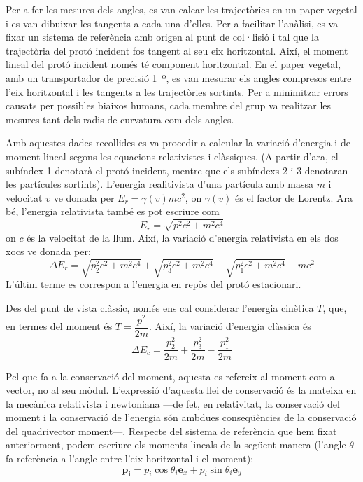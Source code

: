\documentclass[12pt]{article}
\begin{document}
Per a fer les mesures dels angles, es van calcar les trajectòries en un paper vegetal i es van dibuixar les tangents a cada una d'elles. Per a facilitar l'anàlisi, es va fixar un sistema de referència amb origen al punt de col·lisió i tal que la trajectòria del protó incident fos tangent al seu eix horitzontal. Així, el moment lineal del protó incident només té component horitzontal. En el paper vegetal, amb un transportador de precisió \SI{1}{º}, es van mesurar els angles compresos entre l'eix horitzontal i les tangents a les trajectòries sortints. Per a minimitzar errors causats per possibles biaixos humans, cada membre del grup va realitzar les mesures tant dels radis de curvatura com dels angles.

Amb aquestes dades recollides es va procedir a calcular la variació d'energia i de moment lineal segons les equacions relativistes i clàssiques. (A partir d'ara, el subíndex 1 denotarà el protó incident, mentre que els subíndexs 2 i 3 denotaran les partícules sortints). L'energia realitivista d'una partícula amb massa \( m \) i velocitat \( v \) ve donada per \( E_{r} = \gamma(v)mc^{2} \), on \( \gamma(v) \) és el factor de Lorentz. Ara bé, l'energia relativista també es pot escriure com 
\begin{equation}
  E_{r} = \sqrt{p^{2}c^{2} + m^{2}c^{4}}
\end{equation}
on \( c \) és la velocitat de la llum. Així, la variació d'energia relativista en els dos xocs ve donada per:
\begin{equation}
  \Delta E_{r} = \sqrt{p_{2}^{2}c^{2} + m^{2}c^{4}} + \sqrt{p_{3}^{2}c^{2} + m^{2}c^{4}} - \sqrt{p_{1}^{2}c^{2} + m^{2}c^{4}} - mc^{2}
\end{equation}
L'últim terme es correspon a l'energia en repòs del protó estacionari.

Des del punt de vista clàssic, només ens cal considerar l'energia cinètica \( T \), que, en termes del moment és \( T = \dfrac{p^{2}}{2m} \). Així, la variació d'energia clàssica és
\begin{equation}
  \Delta E_{c} = \dfrac{p_{2}^{2}}{2m} + \dfrac{p^{2}_{3}}{2m} - \dfrac{p^{2}_{1}}{2m}
\end{equation}

Pel que fa a la conservació del moment, aquesta es refereix al moment com a vector, no al seu mòdul. L'expressió d'aquesta llei de conservació és la mateixa en la mecànica relativista i newtoniana ---de fet, en relativitat, la conservació del moment i la conservació de l'energia són ambdues conseqüències de la conservació del quadrivector moment---. Respecte del sistema de referència que hem fixat anteriorment, podem escriure els moments lineals de la següent manera (l'angle \( \theta \) fa referència a l'angle entre l'eix horitzontal i el moment):
\begin{equation}
  \mathbf{p_{i}} = p_{i}\cos{\theta_{i}}\mathbf{e}_{x} + p_{i}\sin{\theta_{i}}\mathbf{e}_{y}
\end{equation}
\end{document}
